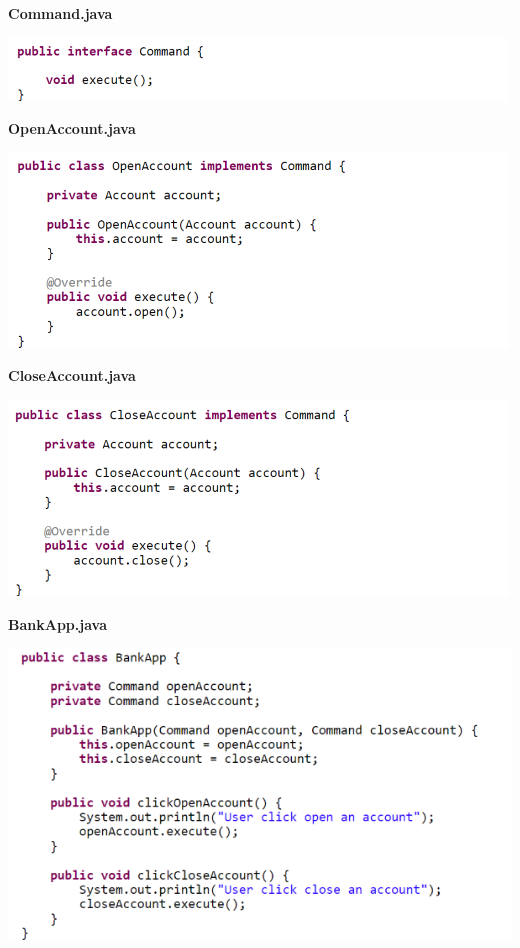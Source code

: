 \textbf{Command.java}
\begin{center}
\includegraphics{GALLEYS/images/chapter7/code2}
\end{center}
\textbf{OpenAccount.java}
\begin{center}
\includegraphics{GALLEYS/images/chapter7/code3}
\end{center}
\textbf{CloseAccount.java}
\begin{center}
\includegraphics{GALLEYS/images/chapter7/code4}
\end{center}
\textbf{BankApp.java}
\begin{center}
\includegraphics{GALLEYS/images/chapter7/code5}
\end{center}
